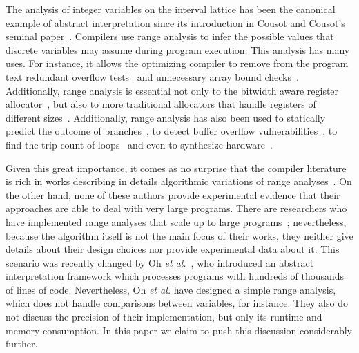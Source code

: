 \documentclass[times]{speauth}
\begin{document}
The analysis of integer variables on the interval lattice has been the
canonical example of abstract interpretation since its introduction in
Cousot and Cousot's seminal paper~\cite{Cousot77}.
Compilers use range analysis to infer the possible values that discrete
variables may assume during program execution.
This analysis has many uses.
For instance, it allows the optimizing compiler to remove from the program text
redundant overflow tests~\cite{Sol11} and unnecessary array bound
checks~\cite{Bodik00,Gampe11}.
Additionally, range analysis is essential not only to the bitwidth aware
register allocator~\cite{Barik06,Tallam03}, but also to more traditional
allocators that handle registers of different
sizes~\cite{Kong98,Pereira08,Scholz02}.
Additionally, range analysis has also been used to statically predict the
outcome of branches~\cite{Patterson95}, to detect buffer overflow
vulnerabilities~\cite{Simon08,Wagner00}, to find the trip count of
loops~\cite{Lokuciejewski09}
and even to synthesize hardware~\cite{Cong05,Lhairech10,Mahlke01}.

Given this great importance, it comes as no surprise that the compiler
literature is rich in works describing in details algorithmic variations of
range analyses~\cite{Gawlitza09,Mahlke01,Stephenson00,Su05}.
On the other hand, none of these authors provide experimental evidence that
their approaches are able to deal with very large programs.
There are researchers who have implemented range analyses that scale up to
large programs~\cite{Blanchet03,Patterson95,Venet04}; nevertheless, because the
algorithm itself is not the main focus of their works, they neither give
details about their design choices nor provide experimental data about it.
This scenario was recently changed by Oh {\em et al.}~\cite{Oh12}, who
introduced an abstract interpretation framework which processes programs with
hundreds of thousands of lines of code.
Nevertheless, Oh {\em et al.} have designed a simple range analysis,
which does not handle comparisons between variables, for instance.
They also do not discuss the precision of their implementation, but only its
runtime and memory consumption.
In this paper we claim to push this discussion considerably further.
\end{document}

